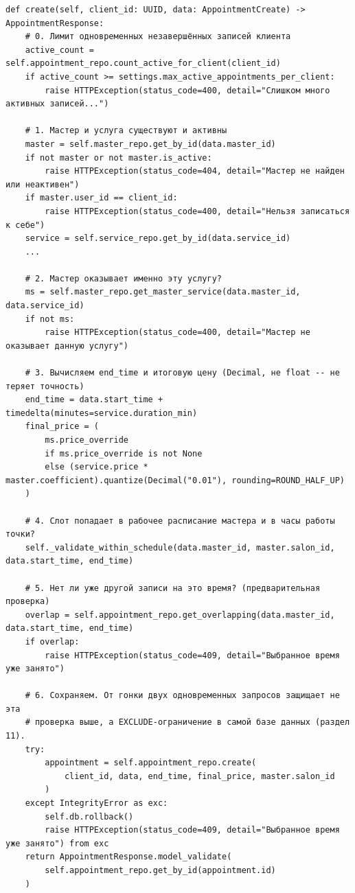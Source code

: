 \begin{verbatim}
def create(self, client_id: UUID, data: AppointmentCreate) -> AppointmentResponse:
    # 0. Лимит одновременных незавершённых записей клиента
    active_count = self.appointment_repo.count_active_for_client(client_id)
    if active_count >= settings.max_active_appointments_per_client:
        raise HTTPException(status_code=400, detail="Слишком много активных записей...")

    # 1. Мастер и услуга существуют и активны
    master = self.master_repo.get_by_id(data.master_id)
    if not master or not master.is_active:
        raise HTTPException(status_code=404, detail="Мастер не найден или неактивен")
    if master.user_id == client_id:
        raise HTTPException(status_code=400, detail="Нельзя записаться к себе")
    service = self.service_repo.get_by_id(data.service_id)
    ...

    # 2. Мастер оказывает именно эту услугу?
    ms = self.master_repo.get_master_service(data.master_id, data.service_id)
    if not ms:
        raise HTTPException(status_code=400, detail="Мастер не оказывает данную услугу")

    # 3. Вычисляем end_time и итоговую цену (Decimal, не float -- не теряет точность)
    end_time = data.start_time + timedelta(minutes=service.duration_min)
    final_price = (
        ms.price_override
        if ms.price_override is not None
        else (service.price * master.coefficient).quantize(Decimal("0.01"), rounding=ROUND_HALF_UP)
    )

    # 4. Слот попадает в рабочее расписание мастера и в часы работы точки?
    self._validate_within_schedule(data.master_id, master.salon_id, data.start_time, end_time)

    # 5. Нет ли уже другой записи на это время? (предварительная проверка)
    overlap = self.appointment_repo.get_overlapping(data.master_id, data.start_time, end_time)
    if overlap:
        raise HTTPException(status_code=409, detail="Выбранное время уже занято")

    # 6. Сохраняем. От гонки двух одновременных запросов защищает не эта
    # проверка выше, а EXCLUDE-ограничение в самой базе данных (раздел 11).
    try:
        appointment = self.appointment_repo.create(
            client_id, data, end_time, final_price, master.salon_id
        )
    except IntegrityError as exc:
        self.db.rollback()
        raise HTTPException(status_code=409, detail="Выбранное время уже занято") from exc
    return AppointmentResponse.model_validate(
        self.appointment_repo.get_by_id(appointment.id)
    )
\end{verbatim}


